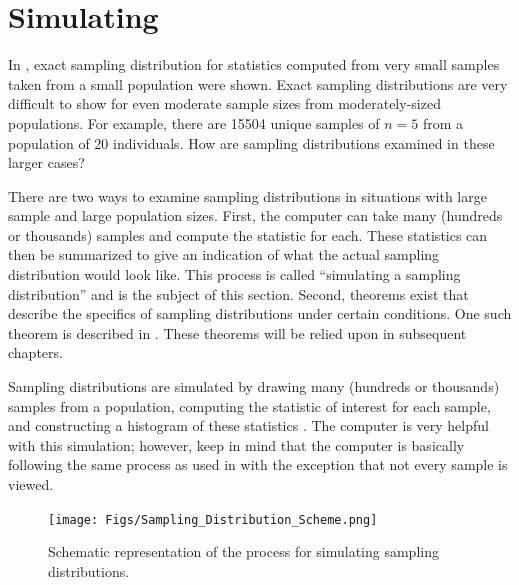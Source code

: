 \documentclass[10pt,openany]{book}\usepackage[]{graphicx}\usepackage[]{color}
\begin{document}


\vspace{-12pt}
\section{Simulating}  \label{sect:SDSimulate}
\vspace{-12pt}
In , exact sampling distribution for statistics computed from very small samples taken from a small population were shown.  Exact sampling distributions are very difficult to show for even moderate sample sizes from moderately-sized populations.  For example, there are 15504 unique samples of $n=5$ from a population of 20 individuals.  How are sampling distributions examined in these larger cases?

There are two ways to examine sampling distributions in situations with large sample and large population sizes.  First, the computer can take many (hundreds or thousands) samples and compute the statistic for each.  These statistics can then be summarized to give an indication of what the actual sampling distribution would look like.  This process is called ``simulating a sampling distribution'' and is the subject of this section.  Second, theorems exist that describe the specifics of sampling distributions under certain conditions.  One such theorem is described in .  These theorems will be relied upon in subsequent chapters.


Sampling distributions are simulated by drawing many (hundreds or thousands) samples from a population, computing the statistic of interest for each sample, and constructing a histogram of these statistics .  The computer is very helpful with this simulation; however, keep in mind that the computer is basically following the same process as used in  with the exception that not every sample is viewed.

\begin{figure}[htbp]
  \centering
    \texttt{[image: Figs/Sampling\_Distribution\_Scheme.png]}
  \caption{Schematic representation of the process for simulating sampling distributions.}
  \label{fig:SamplingDistributionScheme}
\end{figure}
\end{document}
